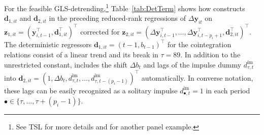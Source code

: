For the feasible GLS-detrending,\footnote{See TSL \citeyearpar[p.~335]{TrenklerEtAl2008} for more details and \citet[Ch.~6]{ArsovaOersal2020} for another panel example.} Table~\ref{tab:DetTerm} shows how  constructs $ \boldsymbol{d}_{1,it} $ and $ \boldsymbol{d}_{2,it} $ in the preceding reduced-rank regressions of $ \Delta \boldsymbol{y}_{it} $ on $ \boldsymbol{z}_{1,it} = \left( \boldsymbol{y}_{i,t-1}^\top, \boldsymbol{d}_{1,it}^\top \right)^\top $ corrected for $ \boldsymbol{z}_{2,it} = \left( \Delta \boldsymbol{y}_{i,t-1}^\top, \ldots, \Delta \boldsymbol{y}_{i,t-p_i+1}^\top, \boldsymbol{d}_{2,it}^\top \right)^\top $. The deterministic regressors $ \boldsymbol{d}_{1,it} = \left( t-1, b_{t-1}^{\ } \right)^\top $ for the cointegration relations consist of a linear trend and its break in $ \tau=89 $. In addition to the unrestricted constant,  includes the shift $ \Delta b_{t} $ and lags of the impulse dummy $  d^{\text{im}}_{\tau,t} $ into $ \boldsymbol{d}_{2,it} = \left( 1, \Delta b_{t}^{\ }, d^{\text{im}}_{\tau,t}, \ldots, d^{\text{im}}_{\tau,t-(p_i-1)} \right)^\top $ automatically. In converse notation, these lags can be easily recognized as a solitary impulse $  d^{\text{im}}_{\bullet,t} = 1 $ in each period $ \bullet \in \{ \tau, \ldots, \tau+(p_i-1)\} $. %


